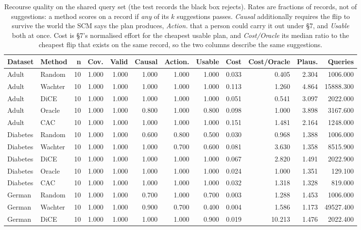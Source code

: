 \begin{table}[t]
\caption{Recourse quality on the shared query set (the test records the black box rejects). Rates are fractions of records, not of suggestions: a method scores on a record if \emph{any} of its $k$ suggestions passes. \emph{Causal} additionally requires the flip to survive the world the SCM says the plan produces, \emph{Action.} that a person could carry it out under \S7, and \emph{Usable} both at once. Cost is \S7's normalised effort for the cheapest usable plan, and \emph{Cost/Oracle} its median ratio to the cheapest flip that exists on the same record, so the two columns describe the same suggestions.}
\label{tab:main_results}
\begin{tabular}{llrrrrrrrrrr}
\toprule
Dataset & Method & n & Cov. & Valid & Causal & Action. & Usable & Cost & Cost/Oracle & Plaus. & Queries \\
\midrule
Adult & Random & 10 & 1.000 & 1.000 & 1.000 & 1.000 & 1.000 & 0.033 & 0.405 & 2.304 & 1006.000 \\
Adult & Wachter & 10 & 1.000 & 1.000 & 1.000 & 1.000 & 1.000 & 0.113 & 1.260 & 4.864 & 15888.300 \\
Adult & DiCE & 10 & 1.000 & 1.000 & 1.000 & 1.000 & 1.000 & 0.051 & 0.541 & 3.097 & 2022.000 \\
Adult & Oracle & 10 & 1.000 & 1.000 & 0.800 & 1.000 & 0.800 & 0.098 & 1.000 & 3.898 & 3167.600 \\
Adult & CAC & 10 & 1.000 & 1.000 & 1.000 & 1.000 & 1.000 & 0.151 & 1.481 & 2.164 & 1248.000 \\
Diabetes & Random & 10 & 1.000 & 1.000 & 0.600 & 0.800 & 0.500 & 0.030 & 0.968 & 1.388 & 1006.000 \\
Diabetes & Wachter & 10 & 1.000 & 1.000 & 1.000 & 0.700 & 0.600 & 0.081 & 3.630 & 1.358 & 8515.900 \\
Diabetes & DiCE & 10 & 1.000 & 1.000 & 1.000 & 1.000 & 1.000 & 0.067 & 2.820 & 1.491 & 2022.900 \\
Diabetes & Oracle & 10 & 1.000 & 1.000 & 1.000 & 1.000 & 1.000 & 0.024 & 1.000 & 1.351 & 129.100 \\
Diabetes & CAC & 10 & 1.000 & 1.000 & 1.000 & 1.000 & 1.000 & 0.032 & 1.318 & 1.328 & 819.000 \\
German & Random & 10 & 1.000 & 1.000 & 0.700 & 1.000 & 0.700 & 0.003 & 1.288 & 1.453 & 1006.000 \\
German & Wachter & 10 & 1.000 & 1.000 & 0.900 & 0.700 & 0.400 & 0.004 & 1.586 & 1.173 & 49527.400 \\
German & DiCE & 10 & 1.000 & 1.000 & 1.000 & 1.000 & 0.900 & 0.019 & 10.213 & 1.476 & 2022.400 \\

\end{tabular}
\end{table}
